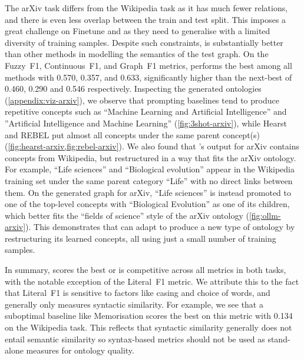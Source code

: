 The arXiv task differs from the Wikipedia task as it has much fewer relations, and there is even less overlap between the train and test split. This imposes a great challenge on Finetune and \name as they need to generalise with a limited diversity of training samples. Despite such constraints, \name is substantially better than other methods in modelling the semantics of the test graph.
On the Fuzzy~F1, Continuous~F1, and Graph~F1 metrics, \name performs the best among all methods with 0.570, 0.357, and 0.633, significantly higher than the next-best of 0.460, 0.290 and 0.546 respectively.
Inspecting the generated ontologies (\cref{appendix:viz-arxiv}), we observe that prompting baselines tend to produce repetitive concepts such as ``Machine Learning and Artificial Intelligence'' and ''Artificial Intelligence and Machine Learning'' (\cref{fig:3shot-arxiv}), while Hearst and REBEL put almost all concepts under the same parent concept(s) (\cref{fig:hearst-arxiv,fig:rebel-arxiv}).
We also found that \name's output for arXiv contains concepts from Wikipedia, but restructured in a way that fits the arXiv ontology. For example, ``Life sciences'' and ``Biological evolution'' appear in the Wikipedia training set under the same parent category ``Life'' with no direct links between them. On the generated graph for arXiv, ``Life sciences'' is instead promoted to one of the top-level concepts with ``Biological Evolution'' as one of its children, which better fits the ``fields of science'' style of the arXiv ontology (\cref{fig:ollm-arxiv}). This demonstrates that \name can adapt to produce a new type of ontology by restructuring its learned concepts, all using just a small number of training samples.

In summary, \name scores the best or is competitive across all metrics in both tasks, with the notable exception of the Literal~F1 metric. We attribute this to the fact that Literal~F1 is sensitive to factors like casing and choice of words, and generally only measures syntactic similarity. For example, we see that a suboptimal baseline like Memorisation scores the best on this metric with 0.134 on the Wikipedia task. This reflects that syntactic similarity generally does not entail semantic similarity so syntax-based metrics should not be used as stand-alone measures for ontology quality.
